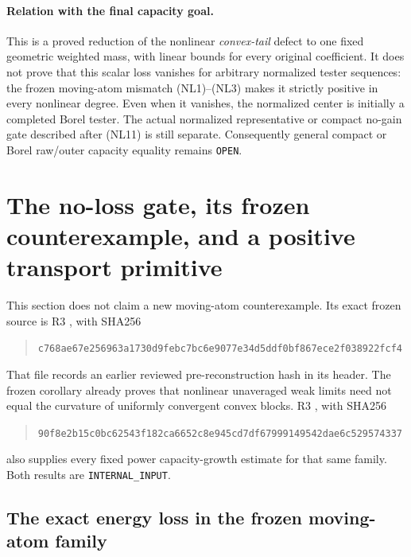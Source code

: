 \documentclass[11pt,a4paper]{article}
\numberwithin{equation}{section}
\theoremstyle{definition}
\theoremstyle{remark}
\begin{document}
\paragraph{Relation with the final capacity goal.}
This is a proved reduction of the nonlinear \emph{convex-tail}
defect to one fixed geometric weighted mass, with linear bounds
for every original coefficient.  It does not prove that this
scalar loss vanishes for arbitrary normalized tester sequences:
the frozen moving-atom mismatch (NL1)--(NL3) makes it strictly
positive in every nonlinear degree.  Even when it vanishes, the
normalized center is initially a completed Borel tester.  The
actual normalized representative or compact no-gain gate described
after (NL11) is still separate.  Consequently general compact or
Borel raw/outer capacity equality remains \texttt{OPEN}.



\section{The no-loss gate, its frozen counterexample, and a positive transport primitive}
\label{sec:r12-no-loss-gate}

This section does not claim a new moving-atom counterexample.
Its exact frozen source is R3
, with SHA256
\begin{quote}\small\ttfamily
\nolinkurl{c768ae67e256963a1730d9febc7bc6e9077e34d5ddf0bf867ece2f038922fcf4}
\end{quote}
That file records an earlier reviewed pre-reconstruction hash in
its header.  The frozen corollary
 already proves that
nonlinear unaveraged weak limits need not equal the curvature of
uniformly convergent convex blocks.  R3
, with SHA256
\begin{quote}\small\ttfamily
\nolinkurl{90f8e2b15c0bc62543f182ca6652c8e945cd7df67999149542dae6c529574337}
\end{quote}
also supplies every fixed power capacity-growth estimate for that
same family.  Both results are \texttt{INTERNAL\_INPUT}.

\subsection{The exact energy loss in the frozen moving-atom family}
\end{document}
